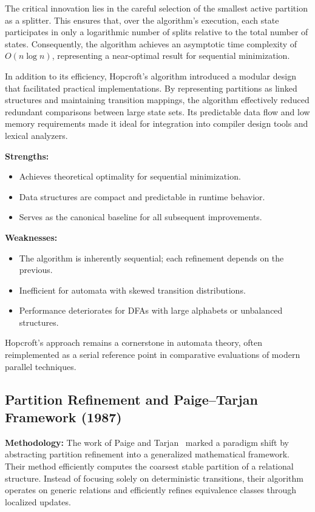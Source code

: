 The critical innovation lies in the careful selection of the smallest active partition as a splitter. This ensures that, over the algorithm’s execution, each state participates in only a logarithmic number of splits relative to the total number of states. Consequently, the algorithm achieves an asymptotic time complexity of $O(n \log n)$, representing a near-optimal result for sequential minimization.

In addition to its efficiency, Hopcroft’s algorithm introduced a modular design that facilitated practical implementations. By representing partitions as linked structures and maintaining transition mappings, the algorithm effectively reduced redundant comparisons between large state sets. Its predictable data flow and low memory requirements made it ideal for integration into compiler design tools and lexical analyzers.

\textbf{Strengths:}
\begin{itemize}
    \item Achieves theoretical optimality for sequential minimization.
    \item Data structures are compact and predictable in runtime behavior.
    \item Serves as the canonical baseline for all subsequent improvements.
\end{itemize}

\textbf{Weaknesses:}
\begin{itemize}
    \item The algorithm is inherently sequential; each refinement depends on the previous.
    \item Inefficient for automata with skewed transition distributions.
    \item Performance deteriorates for DFAs with large alphabets or unbalanced structures.
\end{itemize}

Hopcroft’s approach remains a cornerstone in automata theory, often reimplemented as a serial reference point in comparative evaluations of modern parallel techniques.

\subsection{Partition Refinement and Paige–Tarjan Framework (1987)}

\textbf{Methodology:}
The work of Paige and Tarjan~\cite{paigetarjan1987} marked a paradigm shift by abstracting partition refinement into a generalized mathematical framework. Their method efficiently computes the coarsest stable partition of a relational structure. Instead of focusing solely on deterministic transitions, their algorithm operates on generic relations and efficiently refines equivalence classes through localized updates.

